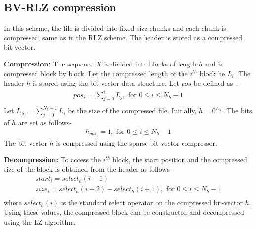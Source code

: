 \subsection{BV-RLZ compression}
In this scheme, the file is divided into fixed-size chunks and each chunk is compressed, same as in the RLZ scheme. The header is stored as a compressed bit-vector.

\textbf{Compression:} The sequence $X$ is divided into blocks of length $b$ and is compressed block by block. Let the compressed length of the $i^{th}$ block be $L_i$. The header $h$ is stored using the bit-vector data structure. Let $pos$ be defined as -
$$
\begin{gathered}
    pos_i = \sum_{j=0}^{i} L_j, \text{ for } 0 \leq i \leq N_b - 1 \\
\end{gathered}
$$
Let $L_X = \sum_{j=0}^{N_b - 1} L_i$ be the size of the compressed file.
Initially, $h = 0^{L_X}$. The bits of $h$ are set as follows-
$$
\begin{gathered}
    h_{pos_i} = 1, \text{ for } 0 \leq i \leq N_b - 1
\end{gathered}
$$
The bit-vector $h$ is compressed using the sparse bit-vector compressor.

\textbf{Decompression:} To access the $i^{th}$ block, the start position and the compressed size of the block is obtained from the header as follows-
$$
\begin{gathered}
    start_i = select_h(i + 1) \\
    size_i = select_h(i + 2) - select_h(i + 1),  \text{ for } 0 \leq i \leq N_b - 1 \\
\end{gathered}
$$
where $select_h(i)$ is the standard select operator on the compressed bit-vector $h$.
Using these values, the compressed block can be constructed and decompressed using the LZ algorithm.

